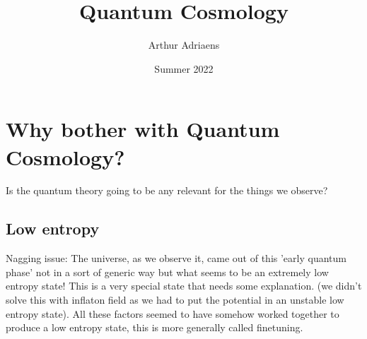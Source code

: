 \documentclass{article}
\title{Quantum Cosmology}
\author{Arthur Adriaens}
\date{Summer 2022}
\begin{document}
	\maketitle

  \section{Why bother with Quantum Cosmology?}
  Is the quantum theory going to be any relevant for the things we observe?
  \subsection{Low entropy}
  Nagging issue: The universe, as we observe it, came out of this 'early quantum phase' not in a sort of generic way but what seems to be an extremely low entropy state! This is a very special state that needs some explanation. (we didn't solve this with inflaton field as we had to put the potential in an unstable low entropy state). All these factors seemed to have somehow worked together to produce a low entropy state, this is more generally called finetuning.
\end{document}
